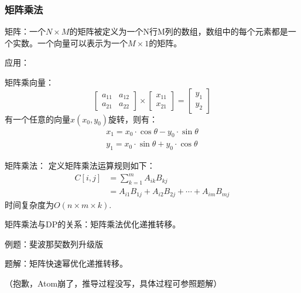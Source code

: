 \subsubsection{矩阵乘法}
矩阵：一个$N\times M$的矩阵被定义为一个N行M列的数组，数组中的每个元素都是一个实数。一个向量可以表示为一个$M\times 1$的矩阵。

应用：

矩阵乘向量：
\begin{equation*}
    \begin{bmatrix}
        a_{11}&a_{12}\\
        a_{21}&a_{22}
    \end{bmatrix}
    \times
    \begin{bmatrix}
        x_{11}\\
        x_{21}
    \end{bmatrix}
    =
    \begin{bmatrix}
        y_1\\
        y_2
    \end{bmatrix}
\end{equation*}
有一个任意的向量$x(x_0,y_0)$旋转\theta\textdegree，则有：
\begin{equation*}
    \begin{aligned}
        x_1=x_0\cdot\cos\theta-y_0\cdot\sin\theta\\
        y_1=x_0\cdot\sin\theta+y_0\cdot\cos\theta
    \end{aligned}
\end{equation*}

矩阵乘法：
定义矩阵乘法运算规则如下：
\begin{equation*}
    \begin{aligned}
        C[i,j]&=\sum_{k=1}^m A_{ik}B_{kj}\\
        &=A_{i1}B_{1j}+A_{i2}B_{2j}+\cdots +A_{im}B_{mj}
    \end{aligned}
\end{equation*}
时间复杂度为$O(n\times m\times k)$.

矩阵乘法与DP的关系：矩阵乘法优化递推转移。

例题：斐波那契数列升级版

题解：矩阵快速幂优化递推转移。

（抱歉，Atom崩了，推导过程没写，具体过程可参照题解）
